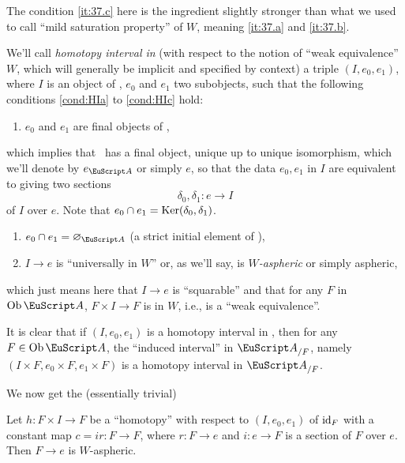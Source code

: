The condition \ref{it:37.c} here is the ingredient slightly stronger
than what we used to call ``mild saturation property'' of $W$, meaning
\ref{it:37.a} and \ref{it:37.b}.

We'll call \emph{homotopy interval in \scrA} (with respect to the
notion of ``weak equivalence'' $W$, which will generally be implicit
and specified by context) a triple $(I,e_0,e_1)$, where $I$ is an
object of \scrA, $e_0$ and $e_1$ two subobjects, such that the
following conditions \ref{cond:HIa} to \ref{cond:HIc} hold:
\begin{enumerate}[label=\alph*)]
\item\label{cond:HIa}
  $e_0$ and $e_1$ are final objects of \scrA,
\end{enumerate}
which implies that \scrA\ has a final object, unique up to unique
isomorphism, which we'll denote by $e_\scrA$ or simply $e$, so that
the data $e_0,e_1$ in $I$ are equivalent to giving two sections
\[ \delta_0,\delta_1 : e \to I\]
of $I$ over $e$. Note that $e_0 \mathbin{\cap} e_1 = \operatorname{Ker}(\delta_0,\delta_1)$.
\begin{enumerate}[label=\alph*),resume]
\item\label{cond:HIb}
  $e_0\sand e_1 = \varnothing_\scrA$ (a strict initial element of \scrA),
\item\label{cond:HIc}
  $I\to e$ is ``universally in $W$'' or, as we'll say, is
  \emph{$W$-aspheric} or simply aspheric,
\end{enumerate}
which just means here that $I\to e$ is ``squarable'' and that for any
$F$ in $\Ob\scrA$, $F\times I \to F$ is in $W$, i.e., is a ``weak
equivalence''.

It is clear that if $(I,e_0,e_1)$ is a homotopy interval in \scrA,
then for any $F\in\Ob\scrA$, the ``induced interval'' in $\scrA_{/F}$,
namely $(I\times F,e_0\times F,e_1\times F)$ is a homotopy interval in
$\scrA_{/F}$.

We now get the (essentially trivial)
\begin{homotopylemma}\label{lem:homotopylemma}
  Let $h: F\times I\to F$ be a ``homotopy'' with respect to
  $(I,e_0,e_1)$ of $\operatorname{id}_F$ with a constant map $c = ir: F\to F$, where
  $r: F\to e$ and $i: e\to F$ is a section of $F$ over $e$. Then $F\to
  e$ is $W$-aspheric.
\end{homotopylemma}

